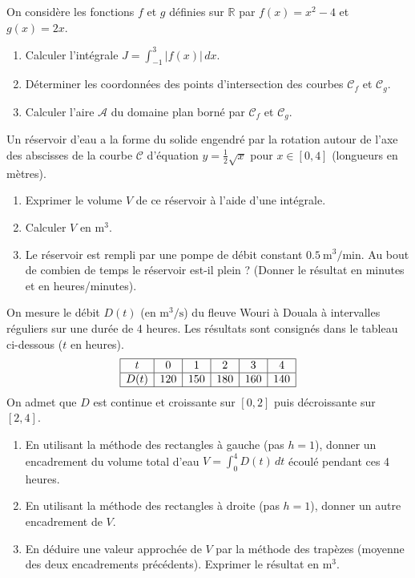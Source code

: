 \documentclass[11pt]{article}
\begin{document}
\begin{exercice}
On considère les fonctions $f$ et $g$ définies sur $\mathbb{R}$ par $f(x) = x^2 - 4$ et $g(x) = 2x$.
\begin{enumerate}
    \item Calculer l'intégrale $J = \int_{-1}^{3} |f(x)| \, dx$.
    \item Déterminer les coordonnées des points d'intersection des courbes $\mathcal{C}_f$ et $\mathcal{C}_g$.
    \item Calculer l'aire $\mathcal{A}$ du domaine plan borné par $\mathcal{C}_f$ et $\mathcal{C}_g$.
\end{enumerate}
\end{exercice}

\begin{exercice}
Un réservoir d'eau a la forme du solide engendré par la rotation autour de l'axe des abscisses de la courbe $\mathcal{C}$ d'équation $y = \frac{1}{2}\sqrt{x}$ pour $x \in [0, 4]$ (longueurs en mètres).
\begin{enumerate}
    \item Exprimer le volume $V$ de ce réservoir à l'aide d'une intégrale.
    \item Calculer $V$ en $\text{m}^3$.
    \item Le réservoir est rempli par une pompe de débit constant $\SI{0.5}{\meter^3/\minute}$. Au bout de combien de temps le réservoir est-il plein ? (Donner le résultat en minutes et en heures/minutes).
\end{enumerate}
\end{exercice}

\begin{exercice}
On mesure le débit $D(t)$ (en $\text{m}^3/\text{s}$) du fleuve Wouri à Douala à intervalles réguliers sur une durée de 4 heures. Les résultats sont consignés dans le tableau ci-dessous ($t$ en heures).
\[
\begin{array}{|c|c|c|c|c|c|}
\hline
t & 0 & 1 & 2 & 3 & 4 \\
\hline
D(t) & 120 & 150 & 180 & 160 & 140 \\
\hline
\end{array}
\]
On admet que $D$ est continue et croissante sur $[0, 2]$ puis décroissante sur $[2, 4]$.
\begin{enumerate}
    \item En utilisant la méthode des rectangles à gauche (pas $h=1$), donner un encadrement du volume total d'eau $V = \int_0^4 D(t) \, dt$ écoulé pendant ces 4 heures.
    \item En utilisant la méthode des rectangles à droite (pas $h=1$), donner un autre encadrement de $V$.
    \item En déduire une valeur approchée de $V$ par la méthode des trapèzes (moyenne des deux encadrements précédents). Exprimer le résultat en $\text{m}^3$.
\end{enumerate}
\end{exercice}
\end{document}
